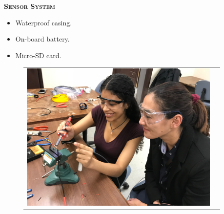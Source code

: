 \documentclass[final,t]{beamer}
\begin{document}
\begin{frame}{}
\begin{columns}
\begin{column}{.33\linewidth}
            \end{column}
            \begin{column}{.33\linewidth}
  				\begin{block}{\textsc{\textbf{Sensor System}}}
                    \begin{itemize}
							\item Waterproof casing.
							\item On-board battery.
							\item Micro-SD card.
				 \end{itemize}
				
                    \begin{center}
                    \begin{figure}
                    \begin{tabular}{cc}
                    \includegraphics[scale = 0.15]{assets/IMG_9097.JPG}
                    \hspace*{5mm}
                    &

\end{tabular}
\end{figure}
\end{center}
\end{block}
\end{column}
\end{columns}
\end{frame}
\end{document}
